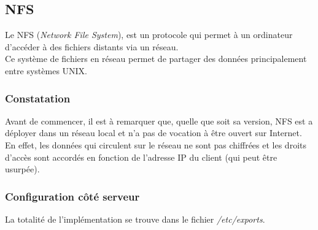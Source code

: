 \subsection{NFS}
\label{subsec:nfs}

Le NFS (\emph{Network File System}), est un protocole qui permet à un ordinateur
d'accéder à des fichiers distants via un réseau. \\
Ce système de fichiers en réseau permet de partager des données principalement
entre systèmes UNIX.

\subsubsection{Constatation}
\label{subsubsec:constatation}

Avant de commencer, il est à remarquer que, quelle que soit sa version, NFS est
a déployer dans un réseau local et n'a pas de vocation à être ouvert sur Internet. \\
En effet, les données qui circulent sur le réseau ne sont pas chiffrées et les
droits d'accès sont accordés en fonction de l'adresse IP du client (qui peut être usurpée).

\subsubsection{Configuration côté serveur}
\label{subsubsec:config-serveur}

La totalité de l'implémentation se trouve dans le fichier
\textit{/etc/exports}.

